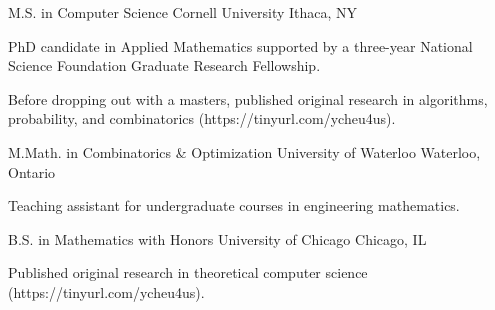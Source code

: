 

\begin{cventries}

  \cventry
    {M.S. in Computer Science} %
    {Cornell University} %
    {Ithaca, NY} %
    {} %
    {
      \begin{cvitems} %
        \item {PhD candidate in Applied Mathematics supported by a three-year National Science Foundation Graduate Research Fellowship.}
        \item {Before dropping out with a masters, published original research in algorithms, probability, and combinatorics (https://tinyurl.com/ycheu4us).}
      \end{cvitems}
    }

  \cventry
    {M.Math. in Combinatorics \& Optimization} %
    {University of Waterloo} %
    {Waterloo, Ontario} %
    {} %
    {
      \begin{cvitems} %
        \item {Teaching assistant for undergraduate courses in engineering mathematics.}
      \end{cvitems}
    }

  \cventry
    {B.S. in Mathematics with Honors} %
    {University of Chicago} %
    {Chicago, IL} %
    {} %
    {
      \begin{cvitems} %
        \item {Published original research in theoretical computer science (https://tinyurl.com/ycheu4us).}
      \end{cvitems}
    }

\end{cventries}
